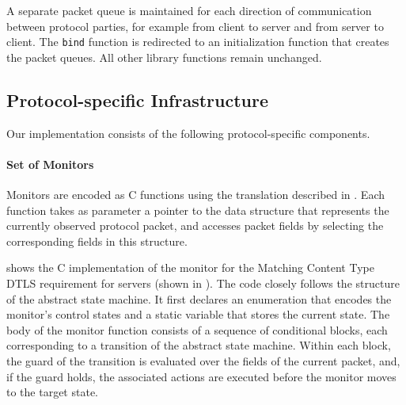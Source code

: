 A separate packet queue is maintained for each direction of communication between protocol parties, for example from client to server and from server to client. 
The \texttt{bind} function is redirected to an initialization function that creates the packet queues. 
All other library functions remain unchanged.

\subsection{Protocol-specific Infrastructure}\label{sec:paper2:protocol-specific}
Our implementation consists of the following protocol-specific components.
\paragraph{Set of Monitors}
Monitors are encoded as C functions using the translation described in .
Each function takes as parameter a pointer to the data structure that represents the currently observed protocol packet, and accesses packet fields by selecting the corresponding fields in this structure.

 shows the C implementation of the monitor for the Matching Content Type DTLS requirement for servers (shown in ).
The code closely follows the structure of the abstract state machine.
It first declares an enumeration that encodes the monitor's control states and a static variable that stores the current state.
The body of the monitor function consists of a sequence of conditional blocks, each corresponding to a transition of the abstract state machine.
Within each block, the guard of the transition is evaluated over the fields of the current packet, and, if the guard holds, the associated actions are executed before the monitor moves to the target state.

